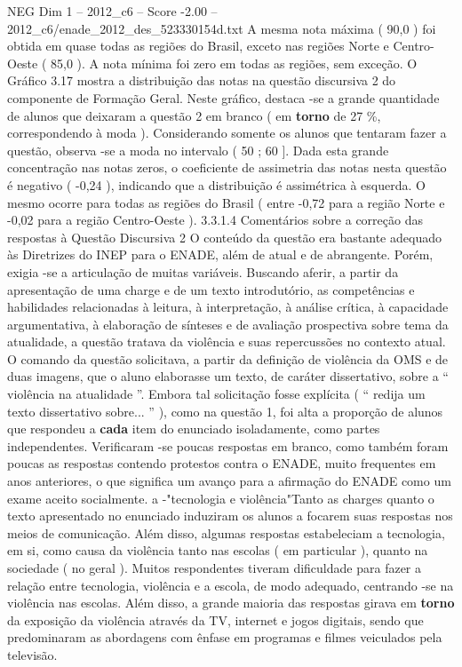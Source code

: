 \begin{textsample}{NEG Dim 1 – 2012\_c6 – Score -2.00 – 2012\_c6/enade\_2012\_des\_523330154d.txt}
A mesma nota máxima ( 90,0 ) foi obtida em quase todas as regiões do Brasil, exceto nas regiões Norte e Centro-Oeste ( 85,0 ).
A nota mínima foi zero em todas as regiões, sem exceção.
O Gráfico 3.17 mostra a distribuição das notas na questão discursiva 2 do componente de Formação Geral.
Neste gráfico, destaca -se a grande quantidade de alunos que deixaram a questão 2 em branco ( em \textbf{torno} de 27 \%, correspondendo à moda ).
Considerando somente os alunos que tentaram fazer a questão, observa -se a moda no intervalo ( 50 ; 60 ].
Dada esta grande concentração nas notas zeros, o coeficiente de assimetria das notas nesta questão é negativo ( -0,24 ), indicando que a distribuição é assimétrica à esquerda.
O mesmo ocorre para todas as regiões do Brasil ( entre -0,72 para a região Norte e -0,02 para a região Centro-Oeste ). 3.3.1.4 Comentários sobre a correção das respostas à Questão Discursiva 2 O conteúdo da questão era bastante adequado às Diretrizes do INEP para o ENADE, além de atual e de abrangente.
Porém, exigia -se a articulação de muitas variáveis.
Buscando aferir, a partir da apresentação de uma charge e de um texto introdutório, as competências e habilidades relacionadas à leitura, à interpretação, à análise crítica, à capacidade argumentativa, à elaboração de sínteses e de avaliação prospectiva sobre tema da atualidade, a questão tratava da violência e suas repercussões no contexto atual.
O comando da questão solicitava, a partir da definição de violência da OMS e de duas imagens, que o aluno elaborasse um texto, de caráter dissertativo, sobre a “ violência na atualidade ”.
Embora tal solicitação fosse explícita ( “ redija um texto dissertativo sobre... ” ), como na questão 1, foi alta a proporção de alunos que respondeu a \textbf{cada} item do enunciado isoladamente, como partes independentes.
Verificaram -se poucas respostas em branco, como também foram poucas as respostas contendo protestos contra o ENADE, muito frequentes em anos anteriores, o que significa um avanço para a afirmação do ENADE como um exame aceito socialmente. a -"tecnologia e violência"Tanto as charges quanto o texto apresentado no enunciado induziram os alunos a focarem suas respostas nos meios de comunicação.
Além disso, algumas respostas estabeleciam a tecnologia, em si, como causa da violência tanto nas escolas ( em particular ), quanto na sociedade ( no geral ).
Muitos respondentes tiveram dificuldade para fazer a relação entre tecnologia, violência e a escola, de modo adequado, centrando -se na violência nas escolas.
Além disso, a grande maioria das respostas girava em \textbf{torno} da exposição da violência através da TV, internet e jogos digitais, sendo que predominaram as abordagens com ênfase em programas e filmes veiculados pela televisão.

\end{textsample}
